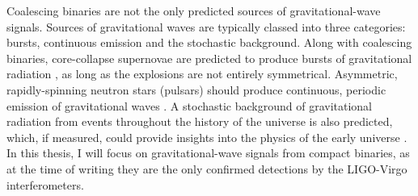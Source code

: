 \begin{colsection}
Coalescing binaries are not the only predicted sources of gravitational-wave signals. Sources of gravitational waves are typically classed into three categories: bursts, continuous emission and the stochastic background. Along with coalescing binaries, core-collapse supernovae are predicted to produce bursts of gravitational radiation \citep{GW_supernovae}, as long as the explosions are not entirely symmetrical. Asymmetric, rapidly-spinning neutron stars (pulsars) should produce continuous, periodic emission of gravitational waves \citep{GW_pulsars}. A stochastic background of gravitational radiation from events throughout the history of the universe is also predicted, which, if measured, could provide insights into the physics of the early universe \citep{GW_background, GW_background2}. In this thesis, I will focus on gravitational-wave signals from compact binaries, as at the time of writing they are the only confirmed detections by the LIGO-Virgo interferometers.

\end{colsection}


